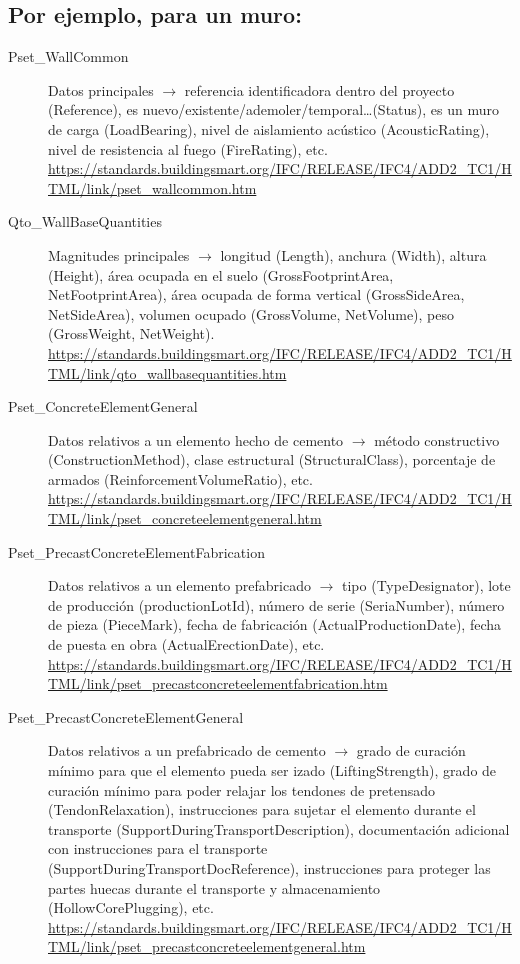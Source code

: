 \documentclass[spanish,12pt,a4paper,final,oneside]{book}
\begin{document}
\subsection{Por ejemplo, para un muro:}
\begin{description}

\item[Pset\_WallCommon] Datos principales $\rightarrow$ referencia identificadora dentro del proyecto (Reference), es nuevo/existente/ademoler/temporal\ldots (Status), es un muro de carga (LoadBearing), nivel de aislamiento acústico (AcousticRating), nivel de resistencia al fuego (FireRating), etc.
\\ \url{https://standards.buildingsmart.org/IFC/RELEASE/IFC4/ADD2_TC1/HTML/link/pset_wallcommon.htm}

\item[Qto\_WallBaseQuantities] Magnitudes principales $\rightarrow$ longitud (Length), anchura (Width), altura (Height), área ocupada en el suelo (GrossFootprintArea, NetFootprintArea), área ocupada de forma vertical (GrossSideArea, NetSideArea), volumen ocupado (GrossVolume, NetVolume), peso (GrossWeight, NetWeight).
\\ \url{https://standards.buildingsmart.org/IFC/RELEASE/IFC4/ADD2_TC1/HTML/link/qto_wallbasequantities.htm}

\item[Pset\_ConcreteElementGeneral] Datos relativos a un elemento hecho de cemento $\rightarrow$ método constructivo (ConstructionMethod), clase estructural (StructuralClass), porcentaje de armados (ReinforcementVolumeRatio), etc.
\\ \url{https://standards.buildingsmart.org/IFC/RELEASE/IFC4/ADD2_TC1/HTML/link/pset_concreteelementgeneral.htm}

\item[Pset\_PrecastConcreteElementFabrication] Datos relativos a un elemento prefabricado $\rightarrow$ tipo (TypeDesignator), lote de producción (productionLotId), número de serie (SeriaNumber), número de pieza (PieceMark), fecha de fabricación (ActualProductionDate), fecha de puesta en obra (ActualErectionDate), etc.
\\ \url{https://standards.buildingsmart.org/IFC/RELEASE/IFC4/ADD2_TC1/HTML/link/pset_precastconcreteelementfabrication.htm}

\item[Pset\_PrecastConcreteElementGeneral] Datos relativos a un prefabricado de cemento $\rightarrow$ grado de curación mínimo para que el elemento pueda ser izado (LiftingStrength), grado de curación mínimo para poder relajar los tendones de pretensado (TendonRelaxation), instrucciones para sujetar el elemento durante el transporte (SupportDuringTransportDescription), documentación adicional con instrucciones para el transporte  (SupportDuringTransportDocReference), instrucciones para proteger las partes huecas durante el transporte y almacenamiento (HollowCorePlugging), etc.
\\ \url{https://standards.buildingsmart.org/IFC/RELEASE/IFC4/ADD2_TC1/HTML/link/pset_precastconcreteelementgeneral.htm}


\end{description}
\end{document}
